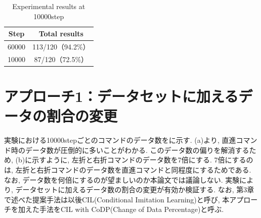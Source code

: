 
\begin{table}[hbtp]
  \caption{Experimental results at 10000step}
  \label{table:result_without}
  \centering
  \begin{tabular}{|c|c|}
    \hline
    Step & Total results\\
    \hline
    60000 & 113/120（94.2\%）\\
    \hline
    10000 & 87/120（72.5\%）\\
    \hline
  \end{tabular}
\end{table}

\newpage



\section{アプローチ1：データセットに加えるデータの割合の変更}
実験における10000stepごとのコマンドのデータ数をに示す.  (a)より, 直進コマンド時のデータ数が圧倒的に多いことがわかる. このデータ数の偏りを解消するため,  (b)に示すように, 左折と右折コマンドのデータ数を7倍にする. 7倍にするのは, 左折と右折コマンドのデータ数を直進コマンドと同程度にするためである. なお, データ数を何倍にするのが望ましいのか本論文では議論しない. 実験により, データセットに加えるデータ数の割合の変更が有効か検証する. なお, 第3章で述べた提案手法は以後CIL(Conditional Imitation Learning)と呼び, 本アプローチを加えた手法をCIL with CoDP(Change of Data Percentage)と呼ぶ.



